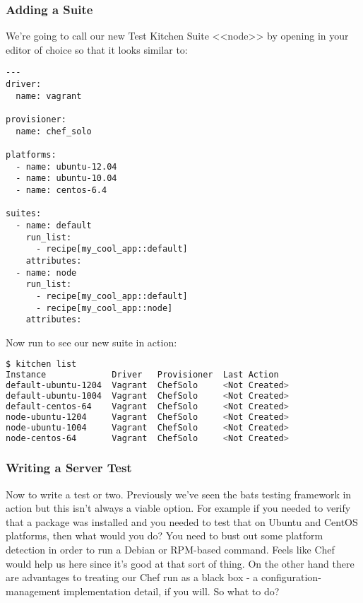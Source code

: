 \subsubsection{Adding a Suite}

We're going to call our new Test Kitchen Suite <<node>> by opening  in your editor of choice so that it looks similar to:

\begin{lstlisting}[label=lst:testing-test-kitchen34]
---
driver:
  name: vagrant

provisioner:
  name: chef_solo

platforms:
  - name: ubuntu-12.04
  - name: ubuntu-10.04
  - name: centos-6.4

suites:
  - name: default
    run_list:
      - recipe[my_cool_app::default]
    attributes:
  - name: node
    run_list:
      - recipe[my_cool_app::default]
      - recipe[my_cool_app::node]
    attributes:
\end{lstlisting}

Now run  to see our new suite in action:

\begin{lstlisting}[language=Bash,label=lst:testing-test-kitchen35]
$ kitchen list
Instance             Driver   Provisioner  Last Action
default-ubuntu-1204  Vagrant  ChefSolo     <Not Created>
default-ubuntu-1004  Vagrant  ChefSolo     <Not Created>
default-centos-64    Vagrant  ChefSolo     <Not Created>
node-ubuntu-1204     Vagrant  ChefSolo     <Not Created>
node-ubuntu-1004     Vagrant  ChefSolo     <Not Created>
node-centos-64       Vagrant  ChefSolo     <Not Created>
\end{lstlisting}



\subsubsection{Writing a Server Test}

Now to write a test or two. Previously we've seen the bats testing framework in action but this isn't always a viable option. For example if you needed to verify that a package was installed and you needed to test that on Ubuntu and CentOS platforms, then what would you do? You need to bust out some platform detection in order to run a Debian or RPM-based command. Feels like Chef would help us here since it's good at that sort of thing. On the other hand there are advantages to treating our Chef run as a black box - a configuration-management implementation detail, if you will. So what to do?

